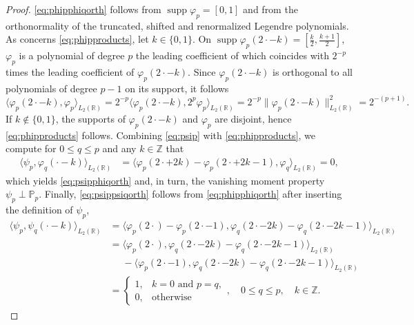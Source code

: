 \documentclass{article}
\DeclareMathOperator{\supp}{supp}
\begin{document}
\begin{proof}
  \eqref{eq:phipphiqorth} follows from $\supp\varphi_p=[0,1]$ and from the orthonormality of the truncated, shifted and renormalized Legendre polynomials. As concerns \eqref{eq:phipproducts}, let $k\in\{0,1\}$. On $\supp\varphi_p(2\cdot-k)=[\frac{k}{2},\frac{k+1}{2}]$,
  $\varphi_p$ is a polynomial of degree $p$ the leading
  coefficient of which coincides with $2^{-p}$ times the leading coefficient of $\varphi_p(2\cdot-k)$.
  Since $\varphi_p(2\cdot-k)$ is orthogonal to all polynomials of degree $p-1$ on its support,
  it follows
  \begin{equation*}
    \big\langle\varphi_p(2\cdot-k),\varphi_p\big\rangle_{L_2(\mathbb R)}
    =
    2^{-p}\big\langle\varphi_p(2\cdot-k),2^p\varphi_p\big\rangle_{L_2(\mathbb R)}
    =
    2^{-p}\big\|\varphi_p(2\cdot-k)\|_{L_2(\mathbb R)}^2
    =
    2^{-(p+1)}.
  \end{equation*}
  If $k\notin\{0,1\}$, the supports of $\varphi_p(2\cdot-k)$ and $\varphi_p$
  are disjoint, hence \eqref{eq:phipproducts} follows.
  Combining \eqref{eq:psip} with \eqref{eq:phipproducts},
  we compute for $0\le q\le p$ and any $k\in\mathbb Z$ that
  \begin{align*}
    \big\langle\psi_p,\varphi_q(\cdot-k)\big\rangle_{L_2(\mathbb R)}
    &=
    \big\langle\varphi_p(2\cdot+2k)-\varphi_p(2\cdot+2k-1),\varphi_q\big\rangle_{L_2(\mathbb R)}
    =0,
  \end{align*}
  which yields \eqref{eq:psipphiqorth} and, in turn, the vanishing moment property
  $\psi_p\perp\mathbb P_p$. Finally, \eqref{eq:psippsiqorth} follows from \eqref{eq:phipphiqorth} after inserting the definition of $\psi_p$,
  \begin{align*}
  \big\langle\psi_p,\psi_q(\cdot-k)\big\rangle_{L_2(\mathbb R)}
  &=
  \big\langle\varphi_p(2\cdot)-\varphi_p(2\cdot-1),\varphi_q(2\cdot-2k)-\varphi_q(2\cdot-2k-1)\big\rangle_{L_2(\mathbb R)}\\
  &=
  \big\langle\varphi_p(2\cdot),\varphi_q(2\cdot-2k)-\varphi_q(2\cdot-2k-1)\big\rangle_{L_2(\mathbb R)}\\
  &\phantom{=}
  -\big\langle\varphi_p(2\cdot-1),\varphi_q(2\cdot-2k)-\varphi_q(2\cdot-2k-1)\big\rangle_{L_2(\mathbb R)}\\
  &=
  \begin{cases}
  1,&k=0\text{ and }p=q,\\
  0,&\text{otherwise}
  \end{cases},\quad 0\le q\le p,\quad k\in\mathbb Z.
  \end{align*}
\end{proof}
\pagebreak
\end{document}

